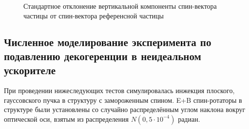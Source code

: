 \begin{figure}[H]
	\centering
	\caption{Стандартное отклонение вертикальной компоненты спин-вектора частицы от спин-вектора референсной частицы\label{fig:decoh:SY_SD}}
\end{figure}
\subsection{Численное моделирование эксперимента по подавлению декогеренции  в неидеальном ускорителе}\label{sec:decoh:sim-imperfect}
При проведении нижеследующих тестов симулировалась инжекция
плоского, гауссовского пучка в структуру с замороженным
спином. E+B спин-ротаторы в структуре были установлены со случайно распределённым углом наклона вокруг оптической оси, взятым из распределения $N(0, 5\cdot10^{-4})$ радиан.

